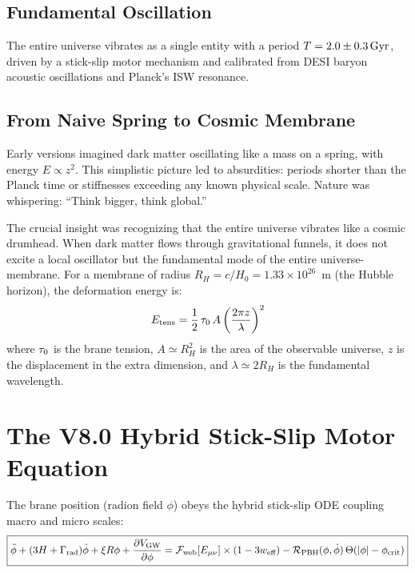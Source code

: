 \subsection{Fundamental Oscillation}

The entire universe vibrates as a single entity with a period $T = 2.0 \pm 0.3\,\text{Gyr}$, driven by a stick-slip motor mechanism and calibrated from DESI baryon acoustic oscillations and Planck's ISW resonance.

\subsection{From Naive Spring to Cosmic Membrane}

Early versions imagined dark matter oscillating like a mass on a spring, with energy $E \propto z^2$. This simplistic picture led to absurdities: periods shorter than the Planck time or stiffnesses exceeding any known physical scale. Nature was whispering: ``Think bigger, think global.''

The crucial insight was recognizing that the entire universe vibrates like a cosmic drumhead. When dark matter flows through gravitational funnels, it does not excite a local oscillator but the fundamental mode of the entire universe-membrane. For a membrane of radius $R_H = c/H_0 = 1.33 \times 10^{26}$~m (the Hubble horizon), the deformation energy is:
\begin{equation}
E_\text{tens} = \frac{1}{2}\,\tau_0\, A \left(\frac{2\pi z}{\lambda}\right)^2
\end{equation}
where $\tau_0$ is the brane tension, $A \simeq R_H^2$ is the area of the observable universe, $z$ is the displacement in the extra dimension, and $\lambda \simeq 2R_H$ is the fundamental wavelength.

\section{The V8.0 Hybrid Stick-Slip Motor Equation}
\label{sec:motor_ode}

The brane position (radion field $\phi$) obeys the hybrid stick-slip ODE coupling macro and micro scales:
\begin{equation}
\boxed{
\ddot{\phi} + (3H + \Gamma_\text{rad})\dot{\phi} + \xi R\phi + \frac{\partial V_\text{GW}}{\partial\phi} = \mathcal{F}_\text{web}[E_{\mu\nu}] \times (1 - 3w_\text{eff}) - \mathcal{R}_\text{PBH}(\phi, \dot{\phi})\,\Theta(|\phi| - \phi_\text{crit})
}
\label{eq:master_ode}
\end{equation}

